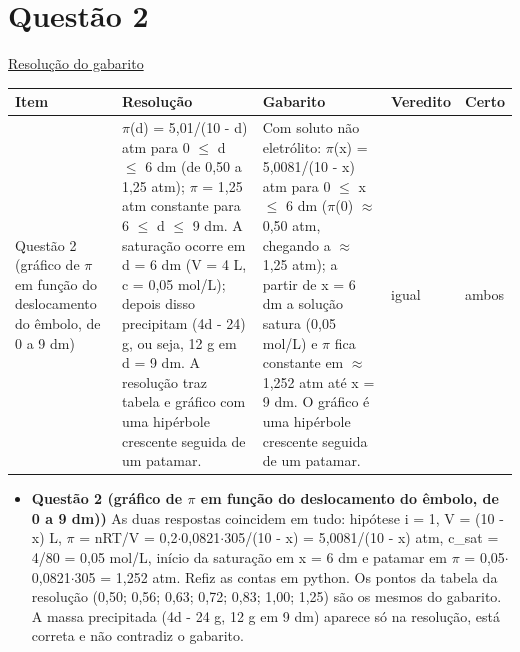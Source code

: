 \documentclass{article}%
\begin{document}
\section*{Questão 2}%
\href{https://poliedroresolve.sistemapoliedro.com.br/vestibulares/ita/2027/ita-2-fase-dia-2-21-10-2026-2-fase-dia-2/dissertativa-2-quimica-2-fase-dia-2-ita-2027}{Resolução do gabarito}\par\smallskip%
\begin{longtable}{@{}p{} p{} p{} p{} p{}@{}}\toprule Item & Resolução & Gabarito & Veredito & Certo \\ \midrule
Questão 2 (gráfico de $\pi$ em função do deslocamento do êmbolo, de 0 a 9 dm) & $\pi$(d) = 5,01/(10 - d) atm para 0 $\leq$ d $\leq$ 6 dm (de 0,50 a 1,25 atm); $\pi$ = 1,25 atm constante para 6 $\leq$ d $\leq$ 9 dm. A saturação ocorre em d = 6 dm (V = 4 L, c = 0,05 mol/L); depois disso precipitam (4d - 24) g, ou seja, 12 g em d = 9 dm. A resolução traz tabela e gráfico com uma hipérbole crescente seguida de um patamar. & Com soluto não eletrólito: $\pi$(x) = 5,0081/(10 - x) atm para 0 $\leq$ x $\leq$ 6 dm ($\pi$(0) $\approx$ 0,50 atm, chegando a $\approx$ 1,25 atm); a partir de x = 6 dm a solução satura (0,05 mol/L) e $\pi$ fica constante em $\approx$ 1,252 atm até x = 9 dm. O gráfico é uma hipérbole crescente seguida de um patamar. & igual & ambos \\
\bottomrule\end{longtable}%
\begin{itemize}%
\item%
\textbf{Questão 2 (gráfico de $\pi$ em função do deslocamento do êmbolo, de 0 a 9 dm))} As duas respostas coincidem em tudo: hipótese i = 1, V = (10 - x) L, $\pi$ = nRT/V = 0,2$\cdot$0,0821$\cdot$305/(10 - x) = 5,0081/(10 - x) atm, c\_sat = 4/80 = 0,05 mol/L, início da saturação em x = 6 dm e patamar em $\pi$ = 0,05$\cdot$0,0821$\cdot$305 = 1,252 atm. Refiz as contas em python. Os pontos da tabela da resolução (0,50; 0,56; 0,63; 0,72; 0,83; 1,00; 1,25) são os mesmos do gabarito. A massa precipitada (4d - 24 g, 12 g em 9 dm) aparece só na resolução, está correta e não contradiz o gabarito.%
\end{itemize}%
\end{document}
